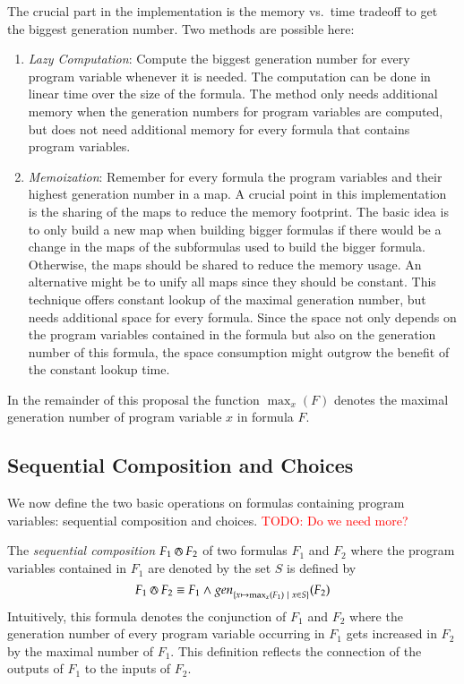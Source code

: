 \documentclass[a4paper,12pt]{article}
\newcommand\gen[1]{\mathop{gen}\nolimits_{#1}}
\newcommand\todo[1]{\textcolor{red}{TODO: #1}}
\newcommand\seqcomp{\circledwedge}
\begin{document}
The crucial part in the implementation is the memory vs.\ time tradeoff to get the biggest generation number.
Two methods are possible here:
\begin{enumerate}
\item \emph{Lazy Computation}: Compute the biggest generation number for every program variable whenever it is needed.
The computation can be done in linear time over the size of the formula.
The method only needs additional memory when the generation numbers for program variables are computed, but does not need additional memory for every formula that contains program variables.
\item \emph{Memoization}: Remember for every formula the program variables and their highest generation number in a map.
A crucial point in this implementation is the sharing of the maps to reduce the memory footprint.
The basic idea is to only build a new map when building bigger formulas if there would be a change in the maps of the subformulas used to build the bigger formula.
Otherwise, the maps should be shared to reduce the memory usage.
An alternative might be to unify all maps since they should be constant.
This technique offers constant lookup of the maximal generation number, but needs additional space for every formula.
Since the space not only depends on the program variables contained in the formula but also on the generation number of this formula, the space consumption might outgrow the benefit of the constant lookup time.
\end{enumerate}

In the remainder of this proposal the function $\max_x(F)$ denotes the maximal generation number of program variable $x$ in formula $F$.

\subsection{Sequential Composition and Choices}
We now define the two basic operations on formulas containing program
variables: sequential composition and choices.
\todo{Do we need more?}

The \emph{sequential composition} $F_1\seqcomp F_2$ of two formulas $F_1$ and $F_2$ where the program variables contained in $F_1$ are denoted by the set $S$ is defined by
\[
F_1\seqcomp F_2\equiv F_1\land\gen{\{x\mapsto\max_x(F_1)\ |\ x\in S\}}(F_2)
\]
Intuitively, this formula denotes the conjunction of $F_1$ and $F_2$ where the generation number of every program variable occurring in $F_1$ gets increased in $F_2$ by the maximal number of $F_1$.
This definition reflects the connection of the outputs of $F_1$ to the inputs of $F_2$.
\end{document}
